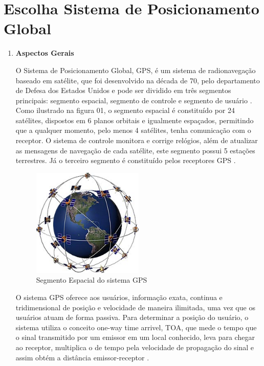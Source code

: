 \chapter[Escolha GPS]{Escolha Sistema de Posicionamento Global}
\begin{enumerate}
\label{appendix:escolha_gps}
\item \textbf{Aspectos Gerais}

O Sistema de Posicionamento Global, GPS, é um sistema de radionavegação
baseado em satélite, que foi desenvolvido na década de 70, pelo departamento
de Defesa dos Estados Unidos e pode ser dividido em três segmentos principais:
segmento espacial, segmento de controle e segmento de usuário \cite{interferidores_gps}.
Como ilustrado na figura 01, o segmento espacial é constituído por
24 satélites, dispostos em 6 planos orbitais e igualmente espaçados,
permitindo que a qualquer momento, pelo menos 4 satélites, tenha
comunicação com o receptor. O sistema de controle monitora e corrige
relógios, além de atualizar as mensagens de navegação de cada satélite,
este segmento possui 5 estações terrestres. Já o terceiro segmento é
constituído pelos receptores GPS \cite{posicionamento_gnss}.

\begin{figure}[h]
  \centering
  \includegraphics[width=200px, scale=1]{figuras/esquema_gps}
  \caption{Segmento Espacial do sistema GPS \cite{entendendo_gps}}
\label{fig:esquema_gps}
\end{figure}

O sistema GPS oferece aos usuários, informação exata, continua e
tridimensional de posição e velocidade de maneira ilimitada, uma
vez que os usuários atuam de forma passiva. Para determinar a posição
do usuário, o sistema utiliza o conceito one-way time arrivel, TOA, que
mede o tempo que o sinal transmitido por um emissor em um local conhecido,
leva para chegar ao receptor, multiplica o de tempo pela velocidade de
propagação do sinal e assim obtém a distância emissor-receptor \cite{sobre_gps}.


\end{enumerate}
